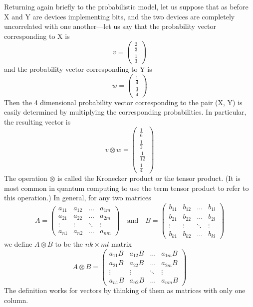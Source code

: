 Returning again briefly to the probabilistic model, let us suppose that as before X and Y are devices
implementing bits, and the two devices are completely uncorrelated with one another—let us say
that the probability vector corresponding to X is
\[
v=\begin{pmatrix} \frac{2}{3} \\ \frac{1}{3} \end{pmatrix}
\]
and the probability vector corresponding to Y is
\[
w=\begin{pmatrix} \frac{1}{4} \\ \frac{3}{4} \end{pmatrix}
\]
Then the 4 dimensional probability vector corresponding to the pair (X, Y) is easily determined by
multiplying the corresponding probabilities. In particular, the resulting vector is
\[
v\otimes w= \begin{pmatrix} \frac{1}{6} \\ \frac{1}{2} \\ \frac{1}{12} \\ \frac{1}{4} \end{pmatrix}
\]
The operation $\otimes$ is called the Kronecker product or the tensor product. (It is most common in
quantum computing to use the term tensor product to refer to this operation.) In general, for any
two matrices
\[
A=\begin{pmatrix} a_{11} & a_{12} &\ldots & a_{1m} \\ a_{21} & a_{22} &\ldots &a_{2m} \\ \vdots & \vdots &\ddots & \vdots \\ a_{n1} & a_{n2} &\ldots & a_{nm} \end{pmatrix} \quad \text{and} \quad B=\begin{pmatrix} b_{11} & b_{12} &\ldots & b_{1l} \\ b_{21}& b_{22} & \ldots & b_{2l} \\ \vdots & \vdots & \ddots & \vdots \\ b_{k1} & b_{k2} & \ldots & b_{kl} \end{pmatrix}
\]
we define $A\otimes B$ to be the $nk \times ml$ matrix
\[
A\otimes B=\begin{pmatrix} a_{11}B & a_{12}B &\ldots & a_{1m}B \\ a_{21}B & a_{22}B &\ldots &a_{2m}B \\ \vdots & \vdots &\ddots & \vdots \\ a_{n1} B& a_{n2}B &\ldots & a_{nm}B \end{pmatrix}
\]
The definition works for vectors by thinking of them as matrices with only one column.
